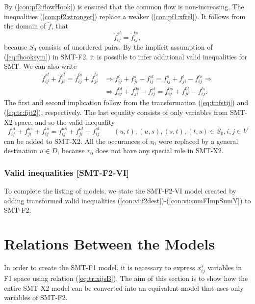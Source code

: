 By (\ref{con:pf2:flowHook}) is ensured that the common flow is non-increasing. The inequalities (\ref{con:pf2:stronger}) replace a weaker (\ref{con:pf1:xfrel}). It follows from the domain of $\check{f}$, that 
\begin{equation}
\label{eq:fhooksym}
\check{f}_{ij}^{st}=\check{f}_{ij}^{ts},
\end{equation}
because $S_0$ consists of unordered pairs. By the implicit assumption of (\ref{eq:fhooksym}) in SMT-F2, it is possible to infer additional valid inequalities for SMT. We can also write
\begin{align*}
\check{f}^{st}_{ij}+\check{f}^{st}_{ji}=\check{f}^{ts}_{ij}+\check{f}^{ts}_{ji} &\Rightarrow f^t_{ij}+f^s_{ji}-f^{st}_{ij}=f^s_{ij}+f^t_{ji}-f^{ts}_{ij}\Rightarrow \\ & \Rightarrow f^{0t}_{ij}+f^{0s}_{ji}-f^{st}_{ij}=f^{0s}_{ij}+f^{0t}_{ji}-f^{ts}_{ij}.
\end{align*}
The first and second implication follow from the transformation (\ref{eq:tr:fstij}) and (\ref{eq:tr:fijt2}), respectively. The last equality consists of only variables from SMT-X2  space, and so the valid inequality
\begin{equation*}f^{ut}_{ij}+f^{us}_{ji}+f^{ts}_{ij}=f^{us}_{ij}+f^{ut}_{ji}+f^{st}_{ij} \quad\quad (u,t),(u,s),(s,t),(t,s)\in S_0, i,j\in V
\end{equation*} 
can be added to  SMT-X2. All the occurances of $v_0$ were replaced by a general destination $u\in D$, because $v_0$ does not have any special role in SMT-X2.

\subsubsection{Valid inequalities [SMT-F2-VI]}

To complete the listing of models, we state the SMT-F2-VI model created by adding transformed valid inequalities (\ref{con:vi:f2dest})-(\ref{con:vi:sumFImpSumY}) to SMT-F2.

\section{Relations Between the Models}
\label{sec:comp}
In order to create the SMT-F1 model, it is necessary to express $x^s_{ij}$ variables in F1 space using relation (\ref{eq:tr:xijsB}). The aim of this section is to show how the entire SMT-X2 model can be converted into an equivalent model that uses only variables of SMT-F2. 


